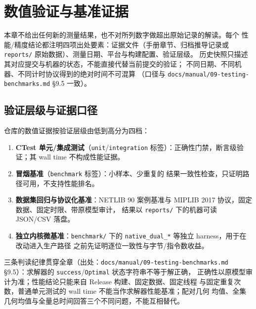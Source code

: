 
\section{数值验证与基准证据}

\begin{boundarynote}
本章不给出任何新的测量结果，也不对所列数字做超出原始记录的解读。每个
性能/精度结论都注明四项出处要素：证据文件（手册章节、归档推导记录或
\texttt{reports/} 原始数据）、测量日期、平台与构建配置、验证层级。
历史快照只描述其对应提交与机器的状态，不能直接代替当前提交的验证；
不同日期、不同机器、不同计时协议得到的绝对时间不可混算
（口径与 \texttt{docs/manual/09-testing-benchmarks.md} §9.5 一致）。
\end{boundarynote}

\subsection{验证层级与证据口径}

仓库的数值证据按验证层级由低到高分为四档：

\begin{enumerate}
  \item \textbf{CTest 单元/集成测试}（\texttt{unit}/\texttt{integration}
        标签）：正确性门禁，断言级验证；其 wall time 不构成性能证据。
  \item \textbf{冒烟基准}（\texttt{benchmark} 标签）：小样本、少重复的
        结果一致性检查，只证明路径可用，不支持性能排名。
  \item \textbf{数据集回归与协议化基准}：NETLIB 90 案例基准与
        MIPLIB 2017 协议，固定数据、固定时限、带原模型审计，
        结果以 \texttt{reports/} 下的机器可读 JSON/CSV 落盘。
  \item \textbf{独立内核微基准}：\texttt{benchmark/} 下的
        \texttt{native\_dual\_*} 等独立 harness，用于在改动进入生产路径
        之前先证明逐位一致性与字节/指令数收益。
\end{enumerate}

三条判读纪律贯穿全章（出处：\texttt{docs/manual/09-testing-benchmarks.md}
§9.5）：求解器的 \texttt{success}/\texttt{Optimal} 状态字符串不等于解正确，
正确性以原模型审计为准；性能结论只能来自 Release 构建、固定数据、固定线程
与固定重复次数，普通单元测试的 wall time 不能当作求解器性能基准；配对几何
均值、全集几何均值与全量总时间回答三个不同问题，不能互相替代。

